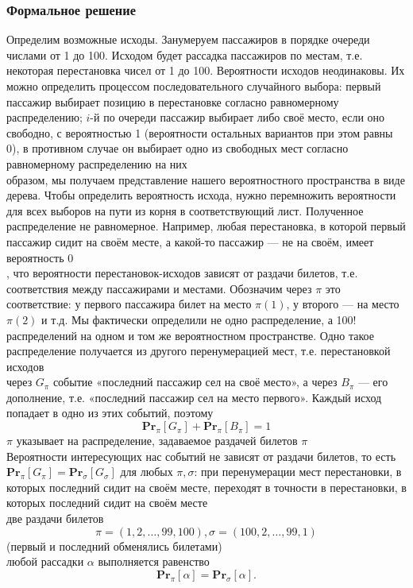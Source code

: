 \documentclass[a4paper]{article}
\begin{document}
\subsubsection*{Формальное решение}
Определим возможные исходы. Занумеруем пассажиров в порядке очереди числами от 1 до 100. Исходом будет рассадка пассажиров по местам, т.е. некоторая перестановка чисел от 1 до 100. Вероятности исходов неодинаковы. Их можно определить процессом последовательного случайного выбора: первый пассажир выбирает позицию в перестановке согласно  равномерному распределению; $i$-й по очереди пассажир выбирает либо своё место, если оно свободно, с вероятностью 1 (вероятности остальных вариантов при этом равны 0), в противном случае он выбирает одно из свободных мест согласно равномерному распределению на них\\[2mm]
 образом, мы получаем представление нашего вероятностного пространства в виде дерева. Чтобы определить вероятность исхода, нужно перемножить вероятности для всех выборов на пути из корня в соответствующий лист. Полученное распределение не равномерное. Например, любая перестановка, в которой первый пассажир сидит на своём месте, а какой-то пассажир — не на своём, имеет вероятность 0\\[2mm]
, что вероятности перестановок-исходов зависят от раздачи билетов, т.е. соответствия между пассажирами и местами. Обозначим через $\pi$ это соответствие: у первого пассажира билет на место $\pi(1)$, у второго — на место $\pi(2)$ и т.д. Мы фактически определили не одно распределение, а 100! распределений на одном и том же вероятностном пространстве. Одно такое распределение получается из другого перенумерацией мест, т.е. перестановкой исходов\\[2mm]
 через $G_\pi$ событие «последний пассажир сел на своё место», а через $B_\pi$ — его дополнение, т.е. «последний пассажир сел на место первого». Каждый исход попадает в одно из этих событий, поэтому
$$\mathbf{P r}_\pi\left[G_\pi\right]+\mathbf{P r}_\pi\left[B_\pi\right]=1$$
 $\pi$ указывает на распределение, задаваемое раздачей билетов $\pi$\\[2mm]
\indent Вероятности интересующих нас событий не зависят от раздачи билетов, то есть $\textbf{Pr}_\pi\left[G_\pi\right]=\textbf{Pr}_\sigma\left[G_\sigma\right]$ для любых $\pi, \sigma$: при перенумерации мест перестановки, в которых последний сидит на своём месте, переходят в точности в перестановки, в которых последний сидит на своём месте\\[2mm]
 две раздачи билетов
$$
\pi=(1,2, \ldots, 99,100), \sigma=(100,2, \ldots, 99,1)
$$
(первый и последний обменялись билетами)\\[2mm]
 любой рассадки $\alpha$ выполняется равенство
$$
\mathbf{P r}_\pi[\alpha]=\mathbf{P r}_\sigma[\alpha] .
$$
\end{document}
